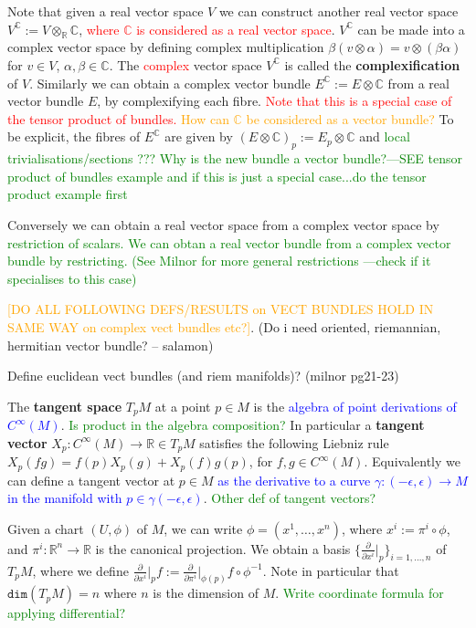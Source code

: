 \documentclass[a4paper]{article}
\theoremstyle{definition} \newtheorem*{definition}{Definition}
\theoremstyle{definition} \newtheorem*{definitions}{Definitions}
\theoremstyle{plain} \newtheorem{theorem}{Theorem}[section]
\theoremstyle{plain} \newtheorem{proposition}[theorem]{Proposition}
\theoremstyle{plain} \newtheorem{corollary}[theorem]{Corollary}
\theoremstyle{plain} \newtheorem{lemma}[theorem]{Lemma}
\theoremstyle{plain} \newtheorem{example}[theorem]{Example}
\newcommand{\checkCorrect}[1]{\textcolor{red}{#1}}
\newcommand{\question}[1]{\textcolor{orange}{#1}}
\newcommand{\explainFurther}[1]{\textcolor{blue}{#1}}
\newcommand{\finish}[1]{\textcolor{green}{#1}}
\newcommand{\defn}[1]{\textbf{#1}}
\newcommand{\realnos}{\mathbb{R}}
\newcommand{\complexnos}{\mathbb{C}}
\begin{document}
Note that given a real vector space $V$ we can construct another real vector space $V^\complexnos := V\otimes_\realnos \complexnos$, \checkCorrect{where $\complexnos$ is considered as a real vector space}. $V^\complexnos$ can be made into a complex vector space by defining complex multiplication $\beta(v\otimes \alpha) = v\otimes (\beta \alpha)$ for $v\in V$, $\alpha, \beta \in \complexnos$. The \checkCorrect{complex} vector space $V^\complexnos$ is called the \defn{complexification} of $V$. Similarly we can obtain a complex vector bundle $E^\complexnos := E\otimes \complexnos$ from a real vector bundle $E$, by complexifying each fibre. \checkCorrect{Note that this is a special case of the tensor product of bundles. \question{How can $\complexnos$ be considered as a vector bundle?}} To be explicit, the fibres of $E^\complexnos$ are given by $(E\otimes \complexnos)_p := E_p\otimes \complexnos$ and \finish{local trivialisations/sections ??? Why is the new bundle a vector bundle?---SEE tensor product of bundles example and if this is just a special case...do the tensor product example first}

Conversely we can obtain a real vector space from a complex vector space by \finish{restriction of scalars. We can obtan a real vector bundle from a complex vector bundle by restricting. (See Milnor for more general restrictions ---check if it specialises to this case)}

\question{[DO ALL FOLLOWING DEFS/RESULTS on VECT BUNDLES HOLD IN SAME WAY on complex vect bundles etc?]}. (Do i need oriented, riemannian, hermitian vector bundle? -- salamon)

Define euclidean vect bundles (and riem manifolds)? (milnor pg21-23)

The \defn{tangent space} $T_p M$ at a point $p\in M$ is  the \explainFurther{algebra of point derivations of $C^\infty (M)$}. \finish{Is product in the algebra composition?}
In particular a \defn{tangent vector} $X_p:C^\infty (M)\to \realnos \in T_p M$ satisfies the following Liebniz rule $X_p(fg)=f(p)X_p(g) + X_p(f)g(p)$, for $f,g\in C^\infty (M)$. Equivalently we can define a tangent vector at $p\in M$ \explainFurther{as the derivative to a curve $\gamma: (-\epsilon, \epsilon)\to M$ in the manifold with $p\in \gamma (-\epsilon, \epsilon)$}. 
 \finish{Other def of tangent vectors?}

Given a chart $(U, \phi)$ of $M$, we can write $\phi = (x^1, \ldots, x^n)$, where $x^i := \pi^i\circ \phi$, and $\pi^i:\realnos^n \to \realnos$ is the canonical projection. We obtain a basis $\{\frac{\partial}{\partial{x^i}} \vert_p\}_{i=1,\ldots, n}$ 
of $T_p M$, where we define $\frac{\partial}{\partial{x^i}} \vert_p f := \frac{\partial}{\partial{\pi^i}}\vert_{\phi (p)} f\circ \phi^{-1}$. Note in particular that 
$\mathtt{dim} (T_p M) = n$ where 
$n$ is the dimension of $M$. \finish{Write coordinate formula for applying differential?}
\end{document}
